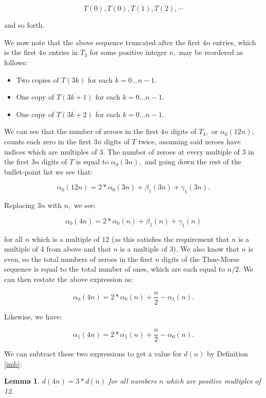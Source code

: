\documentclass{article}
\newtheorem{lemma}{Lemma}[section]
\begin{document}
$$T(0), T(0), \overline{T(1)}, \overline{T(2)}, \cdots$$

and so forth.

We now note that the above sequence truncated after the first $4n$ entries, which is the first $4n$ entries in $T_3$ for some positive integer $n,$ may be reordered as follows:

\begin{itemize}
\label{reorder}
\item Two copies of $T(3k)$ for each $k = 0 ... n - 1.$
\item One copy of $\overline{T(3k+1)}$ for each $k = 0 ... n - 1.$
\item One copy of $\overline{T(3k+2)}$ for each $k = 0 ... n - 1.$
\end{itemize}

We can see that the number of zeroes in the first $4n$ digits of $T_3,$ or $\alpha_0(12n),$ counts each zero in the first $3n$ digits of $T$ twice, assuming said zeroes have indices which are multiples of 3. The number of zeroes at every multiple of 3 in the first $3n$ digits of $T$ is equal to $\alpha_0(3n),$ and going down the rest of the bullet-point list we see that:

$$\alpha_0(12n) = 2 * \alpha_0(3n) + \beta_1(3n) + \gamma_1(3n).$$

Replacing $3n$ with $n,$ we see:

$$\alpha_0(4n) = 2 * \alpha_0(n) + \beta_1(n) + \gamma_1(n)$$

for all $n$ which is a multiple of $12$ (as this satisfies the requirement that $n$ is a multiple of 4 from above and that $n$ is a multiple of 3).
We also know that $n$ is even, so the total numbers of zeroes in the first $n$ digits of the Thue-Morse sequence is equal to the total number of ones, which are each equal to $n/2.$ We can then restate the above expression as:

$$\alpha_0(4n) = 2 * \alpha_0(n) + \frac{n}{2} - \alpha_1(n).$$

Likewise, we have:

$$\alpha_1(4n) = 2 * \alpha_1(n) + \frac{n}{2} - \alpha_0(n).$$

We can subtract these two expressions to get a value for $d(n)$ by Definition \ref{imb}:

\begin{lemma}
\label{ratiospec}
$d(4n) = 3 * d(n)$ for all numbers $n$ which are positive multiples of 12.
\end{lemma}
\end{document}

